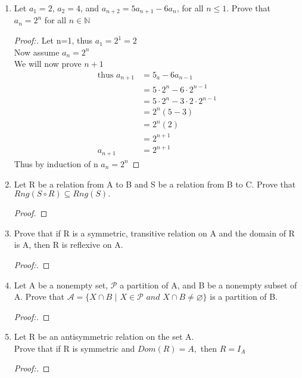 \documentclass[11pt]{article}
\begin{document}
\begin{enumerate}
    \item Let $a_1=2$, $a_2=4$, and $a_{n+2} = 5a_{n+1} - 6a_n$, for all $n \leq 1.$ Prove that $a_n = 2^n$ for all $n \in \mathbb{N}$
        \begin{proof}[Proof:\nopunct]
        Let n=1, thus $a_1 = 2^1 = 2$ \\
        Now assume $a_n=2^n$ \\
        We will now prove $n+1$
            \begin{align*}
                \text{thus } a_{n+1} & = 5_a-6a_{n-1} \\
                & = 5\cdot2^n - 6\cdot2^{n-1} \\
                & = 5 \cdot 2^n-3\cdot2\cdot2^{n-1} \\
                & = 2^n(5-3) \\
                & = 2^n(2) \\
                & = 2^{n+1} \\
                a_{n+1} & = 2^{n+1}
            \end{align*}
            Thus by induction of n $a_n=2^n$
        \end{proof}
        
    \item Let R be a relation from A to B and S be a relation from B to C. \newline
    Prove that $Rng(S\circ R) \subseteq Rng(S).$
        \begin{proof}
        \end{proof}
        
    \item Prove that if R is a symmetric, transitive relation on A and the domain of R is A, then R is reflexive on A. 
     \begin{proof}[Proof:\nopunct]
        \end{proof}
        
    \item Let A be a nonempty set, $\mathscr{P}$ a partition of A, and B be a nonempty subset of A. \newline Prove that $\mathscr{A}=\{X \cap B$ $|$ $X \in \mathscr{P}$ $and$ $X \cap B \neq \varnothing \}$ is a partition of B.
        \begin{proof}[Proof:\nopunct]
        \end{proof}
        
    \item Let R be an antisymmetric relation on the set A. 
    \\ Prove that if R is symmetric and $Dom(R) = A,$ then $R=I_A$
       \begin{proof}[Proof:\nopunct]
        \end{proof}
        

\end{enumerate}
\end{document}
